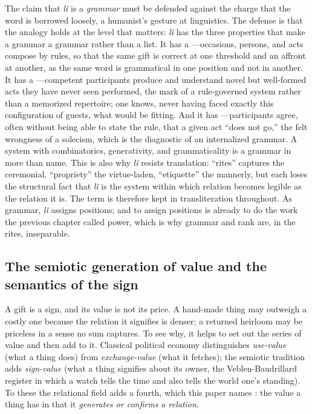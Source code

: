 The claim that \emph{lǐ} is a \emph{grammar} must be defended against the charge that the word is borrowed loosely, a humanist's gesture at linguistics. The defense is that the analogy holds at the level that matters: \emph{lǐ} has the three properties that make a grammar a grammar rather than a list. It has a ---occasions, persons, and acts compose by rules, so that the same gift is correct at one threshold and an affront at another, as the same word is grammatical in one position and not in another. It has a ---competent participants produce and understand novel but well-formed acts they have never seen performed, the mark of a rule-governed system rather than a memorized repertoire; one knows, never having faced exactly this configuration of guests, what would be fitting. And it has ---participants agree, often without being able to state the rule, that a given act ``does not go,'' the felt wrongness of a solecism, which is the diagnostic of an internalized grammar. A system with combinatorics, generativity, and grammaticality is a grammar in more than name. This is also why \emph{lǐ} resists translation: ``rites'' captures the ceremonial, ``propriety'' the virtue-laden, ``etiquette'' the mannerly, but each loses the structural fact that \emph{lǐ} is the system within which relation becomes legible as the relation it is. The term is therefore kept in transliteration throughout. As grammar, \emph{lǐ} assigns positions; and to assign positions is already to do the work the previous chapter called power, which is why grammar and rank are, in the rites, inseparable.

\subsection{The semiotic generation of value and the semantics of the sign}
A gift is a sign, and its value is not its price. A hand-made thing may outweigh a costly one because the relation it signifies is denser; a returned heirloom may be priceless in a sense no sum captures. To see why, it helps to set out the series of value and then add to it. Classical political economy distinguishes \emph{use-value} (what a thing does) from \emph{exchange-value} (what it fetches); the semiotic tradition adds \emph{sign-value} (what a thing signifies about its owner, the Veblen-Baudrillard register in which a watch tells the time and also tells the world one's standing). To these the relational field adds a fourth, which this paper names : the value a thing has in that it \emph{generates or confirms a relation}.

